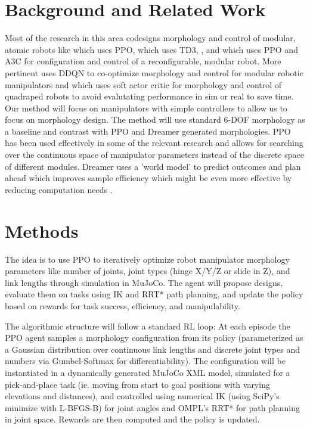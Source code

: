 \documentclass[conference]{IEEEtran}
\begin{document}
\section{Background and Related Work}
Most of the research in this area codesigns morphology and control of modular, atomic robots like \cite{bhatia2023reinforcement} which uses PPO, \cite{tjanaka2023co} which uses TD3, \cite{spielberg2025accelerated}, and \cite{kalimuthu2023} which uses PPO and A3C for configuration and control of a reconfigurable, modular robot.
More pertinent \cite{ding2024modular} uses DDQN to co-optimize morphology and control for modular robotic manipulators and \cite{luck2019data} which uses soft actor critic for morphology and control of quadraped robots to avoid evalutating performance in sim or real to save time.
Our method will focus on manipulators with simple controllers to allow us to focus on morphology design.
The method will use standard 6-DOF morphology as a baseline and contrast with PPO and Dreamer generated morphologies.
PPO has been used effectively in some of the relevant research and allows for searching over the continuous space of manipulator parameters instead of the discrete space of different modules.
Dreamer uses a 'world model' to predict outcomes and plan ahead which improves sample efficiency which might be even more effective by reducing computation needs \cite{hafner2019dream}.

\section{Methods}
The idea is to use PPO to iteratively optimize robot manipulator morphology parameters like number of joints, joint types (hinge X/Y/Z or slide in Z), and link lengths through simulation in MuJoCo.
The agent will propose designs, evaluate them on tasks using IK and RRT* path planning, and update the policy based on rewards for task success, efficiency, and manipulability.

The algorithmic structure will follow a standard RL loop: At each episode the PPO agent samples a morphology configuration from its policy (parameterized as a Gaussian distribution over continuous link lengths and discrete joint types and numbers via Gumbel-Softmax for differentiability).
The configuration will be instantiated in a dynamically generated MuJoCo XML model, simulated for a pick-and-place task (ie. moving from start to goal positions with varying elevations and distances), and controlled using numerical IK (using SciPy's minimize with L-BFGS-B) for joint angles and OMPL's RRT* for path planning in joint space.
Rewards are then computed and the policy is updated.
\end{document}
